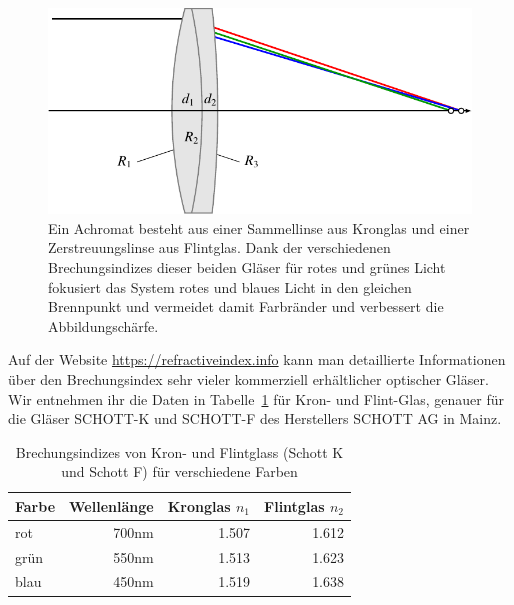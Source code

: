 \begin{figure}
\centering
\includegraphics{applications/matrixoptik/achr.pdf}
\caption{Ein Achromat besteht aus einer Sammellinse aus Kronglas und einer
Zerstreuungslinse aus Flintglas.
Dank der verschiedenen Brechungsindizes dieser beiden Gläser für rotes
und grünes Licht fokusiert das System rotes und blaues Licht in den gleichen
Brennpunkt und vermeidet damit Farbränder und verbessert die Abbildungschärfe.
\label{mo:achr}}
\end{figure}

Auf der Website \url{https://refractiveindex.info} kann man detaillierte
Informationen über den Brechungsindex sehr vieler kommerziell erhältlicher
optischer Gläser.
Wir entnehmen ihr die Daten in Tabelle~\ref{mo:indextabelle} für Kron-
und Flint-Glas, genauer für die Gläser SCHOTT-K und SCHOTT-F des Herstellers
SCHOTT AG in Mainz.
\begin{table}
\centering
\begin{tabular}{|l|r|r|r|}
\hline
Farbe&Wellenlänge&Kronglas $n_1$&Flintglas $n_2$\\
\hline
rot  &700nm& 1.507&1.612\\
grün &550nm& 1.513&1.623\\
blau &450nm& 1.519&1.638\\
\hline
\end{tabular}
\caption{Brechungsindizes von Kron- und Flintglass (Schott K und Schott F)
für verschiedene Farben
\label{mo:indextabelle}}
\end{table}

